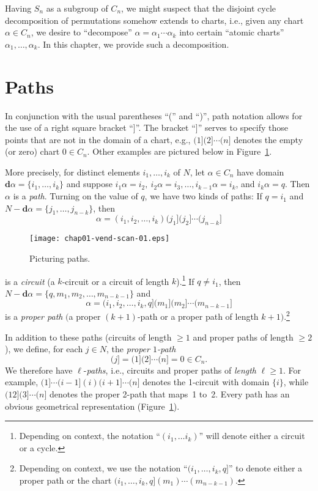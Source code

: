 \documentclass{surv-l}
\numberwithin{equation}{section}
\numberwithin{table}{section}
\numberwithin{figure}{section}
\theoremstyle{plain}
\theoremstyle{definition}
\begin{document}
Having $S_{n}$ as a subgroup of $C_{n}$, we might suspect that the
disjoint cycle decomposition of permutations somehow extends to
charts, i.e., given any chart $\alpha\in C_{n}$, we desire to
``decompose'' $\alpha=\alpha_{1}\cdots\alpha_{k}$ into certain
``atomic charts'' $\alpha_{1},\ldots,\alpha_{k}$. In this chapter,
we provide such a decomposition.

\section{Paths}\label{sec1.1}

In conjunction with the usual parentheses ``('' and ``)'', path
notation allows for the use of a right square bracket ``]''. The
bracket ``]'' serves to specify those points that are not in the
domain of a chart, e.g., $(1](2]\cdots(n]$ denotes the empty (or
zero) chart $0\in C_{n}$. Other examples are pictured below in
Figure~\ref{fig1.1.1}.

More precisely, for distinct elements $i_{1},\ldots, i_{k}$ of
$N$, let $\alpha\in C_{n}$ have domain
$\mathbf{d}\alpha=\{i_{1},\ldots,i_{k}\}$ and suppose
$i_{1}\alpha=i_{2},\ i_{2}\alpha=i_{3},\ldots,
i_{k-1}\alpha=i_{k}$, and $i_{k}\alpha=q$. Then $\alpha$ is a
\emph{path}. Turning on the value of $q$, we have two kinds of
paths: If $q=i_{1}$ and $N-\mathbf{d}\alpha=\{j_{1},\ldots,
j_{n-k}\}$, then
\[
\alpha=(i_{1},i_{2},\ldots, i_{k})(j_{1}](j_{2}]\cdots(j_{n-k}]
\]

\begin{figure}[!h]
\texttt{[image: chap01-vend-scan-01.eps]}
\caption{Picturing paths.}\label{fig1.1.1}
\end{figure}

\noindent is a \emph{circuit} (a
$k$-circuit or a circuit of
length $k$).\footnote{Depending on
context, the notation ``$(i_{1},\ldots i_{k})$'' will denote either a
circuit or a cycle.} If $q\neq i_{1}$, then $N-\mathbf{d}\alpha=
\{q,m_{1}, m_{2},\ldots, m_{n-k-1}\}$ and
\[
\alpha=(i_{1},i_{2},\ldots,i_{k},q](m_{1}](m_{2}]\cdots(m_{n-k-1}]
\]
is a \emph{proper path} $($a proper
$(k+1)$-path or a proper path of length $k+1)$.\footnote{Depending
on context, we use the notation ``$(i_{1},\ldots, i_{k},q]$'' to
denote either a proper path or the chart $(i_{1},\ldots,
i_{k},q](m_{1})\cdots(m_{n-k-1})$.}

In addition to these paths (circuits of length $\geq 1$ and proper
paths of length $\geq 2$), we define, for each $j\in N$, the
\emph{proper $1$-path}
\[
(j]=(1](2]\cdots(n]=0\in C_{n}.
\]
We therefore have $\ell$-\emph{paths}, i.e., circuits and proper
paths of \emph{length}
$\ell\geq 1$. For example, $(1]\cdots (i-1](i)(i+1]\cdots(n]$
denotes the 1-circuit with domain $\{i\}$, while
$(12](3]\cdots(n]$ denotes the proper 2-path that maps~1 to~2.
Every path has an obvious geometrical representation
(Figure~\ref{fig1.1.1}).
\end{document}
